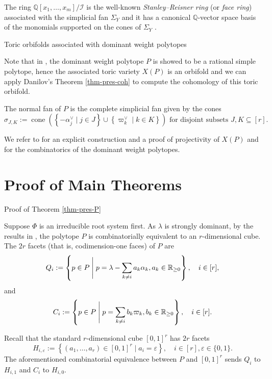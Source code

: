 \documentclass{amsart}
\makeatletter
\def\subsection{\@startsection{subsection}{2}
  \z@{.5\linespacing\@plus.7\linespacing}{.5\linespacing}
  {\normalfont\bfseries}}
\theoremstyle{definition}
\theoremstyle{remark}
\numberwithin{equation}{section}
\makeatother
\begin{document}
The ring $\mathbb{Q}[x_1, \ldots, x_m]/\mathcal{I}$ is the well-known \emph{Stanley--Reisner ring} (or \emph{face ring}) associated with the simplicial fan $\Sigma_Y$ and it has a canonical $\mathbb{Q}$-vector space basis of the monomials supported on the cones of $\Sigma_Y$ \cite[pp.\ 3--5]{zbMATH02190625}.

\subsection{Toric orbifolds associated with dominant weight polytopes}

Note that in \cite{BGHpolytope}, the dominant weight polytope $P$ is showed to be a rational simple polytope, hence the associated toric variety $X(P)$ is an orbifold and we can apply Danilov's Theorem \ref{thm-pres-coh} to compute the cohomology of this toric orbifold.

The normal fan of $P$ is the complete simplicial fan given by the cones 
$$\sigma_{J, K}:=\operatorname{cone}\left(\left\{-\alpha_j^{\vee} \mid j \in J\right\} \cup\left\{\varpi_k^{\vee} \mid k \in K\right\}\right) \text { for disjoint subsets } J, K \subseteq [r].$$

We refer to \cite[sections 3 and 4]{abe2023peterson} for an explicit construction and a proof of projectivity of $X(P)$ and \cite{BGHpolytope} for the combinatorics of the dominant weight polytopes.

 \section{Proof of Main Theorems}

\subsection{Proof of Theorem \ref{thm-pres-P}}

Suppose $\Phi$ is an irreducible root system first. As $\lambda$ is strongly dominant, by the results in \cite{BGHpolytope}, the polytope $P$ is combinatorially equivalent to an $r$-dimensional cube. 
The $2r$ facets (that is, codimension-one faces) of $P$ are 
\[Q_i := \left\{p \in P \Biggm\vert p = \lambda - \sum_{k \ne i} a_k \alpha_k, a_k \in \mathbb{R}_{\ge 0} \right\}, \quad i \in [r],\]
and 
\[C_i := \left\{p \in P \Biggm\vert p = \sum_{k \ne i} b_k \varpi_k, b_k \in \mathbb{R}_{\ge 0} \right\}, \quad i \in [r].\]

Recall that the standard $r$-dimensional cube $[0,1]^r$ has $2r$ facets
\[H_{i,\varepsilon} := \left\{(a_1, \dots, a_r) \in [0,1]^r \mid a_i = \varepsilon \right\}, \quad i \in [r], \varepsilon \in \{0,1\}.\]
The aforementioned combinatorial equivalence between $P$ and $[0,1]^r$ sends $Q_i$ to $H_{i,1}$ and $C_i$ to $H_{i,0}$.
\end{document}
